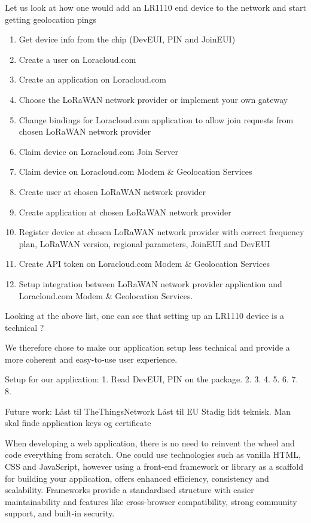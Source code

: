 Let us look at how one would add an LR1110 end device to the network and start getting geolocation pings
\begin{enumerate}
    \item Get device info from the chip (\ac{DevEUI}, PIN and \ac{JoinEUI})
    \item Create a user on Loracloud.com 
    \item Create an application on Loracloud.com
    \item Choose the \ac{LoRaWAN} network provider or implement your own gateway
    \item Change bindings for Loracloud.com application to allow join requests from chosen \ac{LoRaWAN} network provider
    \item Claim device on Loracloud.com Join Server
    \item Claim device on Loracloud.com Modem \& Geolocation Services
    \item Create user at chosen \ac{LoRaWAN} network provider
    \item Create application at chosen \ac{LoRaWAN} network provider
    \item Register device at chosen \ac{LoRaWAN} network provider with correct frequency plan, \ac{LoRaWAN} version, regional parameters, \ac{JoinEUI} and \ac{DevEUI}
    \item Create API token on Loracloud.com Modem \& Geolocation Services
    \item Setup integration between \ac{LoRaWAN} network provider application and Loracloud.com Modem \& Geolocation Services.
\end{enumerate}

Looking at the above list, one can see that setting up an LR1110 device is a technical ?

We therefore chose to make our application setup less technical and provide a more coherent and easy-to-use user experience.

Setup for our application:
1. Read \ac{DevEUI}, PIN on the package.
2. 
3.
4.
5.
6.
7.
8.

Future work:
Låst til TheThingsNetwork
Låst til EU
Stadig lidt teknisk. Man skal finde application keys og certificate

When developing a web application, there is no need to reinvent the wheel and code everything from scratch. One could use technologies such as vanilla HTML, CSS and JavaScript, however using a front-end framework or library as a scaffold for building your application, offers enhanced efficiency, consistency and scalability. Frameworks provide a standardised structure with easier maintainability and features like cross-browser compatibility, strong community support, and built-in security.

